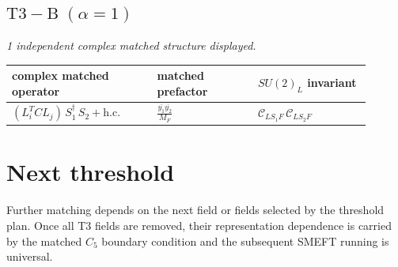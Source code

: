 \documentclass[9pt]{article}
\begin{document}
\subsection*{$ \mathrm{T3-B}\;(\alpha=1) $}
\textit{1 independent complex matched structure displayed. }
\begin{longtable}{@{}p{0.36\linewidth}p{0.25\linewidth}p{0.29\linewidth}@{}}
\toprule
complex matched operator & matched prefactor & $SU(2)_L$ invariant \\
\midrule
$ (L_i^T C L_j)\,S_1^\dagger\,S_2+\mathrm{h.c.} $ & $ \frac{\overline{y_{1}} \overline{y_{2}}}{M_F} $ & $ \mathcal{C}_{LS_1F}\,\mathcal{C}_{LS_2F} $ \\
\bottomrule
\end{longtable}
\section*{Next threshold}
Further matching depends on the next field or fields selected by the threshold plan.  Once all T3 fields are removed, their representation dependence is carried by the matched $C_5$ boundary condition and the subsequent SMEFT running is universal.
\end{document}
